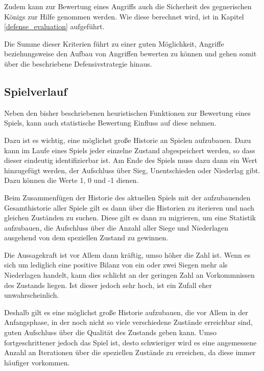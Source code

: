 
Zudem kann zur Bewertung eines Angriffs auch die Sicherheit des gegnerischen Königs zur Hilfe genommen werden. Wie diese berechnet wird, ist in Kapitel \ref{defense_evaluation} aufgeführt.

Die Summe dieser Kriterien führt zu einer guten Möglichkeit, Angriffe beziehungsweise den Aufbau von Angriffen bewerten zu können und gehen somit über die beschriebene Defensivstrategie hinaus.


\subsection{Spielverlauf}\label{history_evaluation}

Neben den bisher beschriebenen heuristischen Funktionen zur Bewertung eines Spiels, kann auch statistische Bewertung Einfluss auf diese nehmen.

Dazu ist es wichtig, eine möglichst große Historie an Spielen aufzubauen. Dazu kann im Laufe eines Spiels jeder einzelne Zustand abgespeichert werden, so dass dieser eindeutig identifizierbar ist. Am Ende des Spiels muss dazu dann ein Wert hinzugefügt werden, der Aufschluss über Sieg, Unentschieden oder Niederlag gibt. Dazu können die Werte 1, 0 und -1 dienen.

Beim Zusammenfügen der Historie des aktuellen Spiels mit der aufzubauenden Gesamthistorie aller Spiele gilt es dann über die Historien zu iterieren und nach gleichen Zuständen zu suchen. Diese gilt es dann zu migrieren, um eine Statistik aufzubauen, die Aufschluss über die Anzahl aller Siege und Niederlagen ausgehend von dem speziellen Zustand zu gewinnen.

Die Aussagekraft ist vor Allem dann kräftig, umso höher die Zahl ist. Wenn es sich um lediglich eine positive Bilanz von ein oder zwei Siegen mehr als Niederlagen handelt, kann dies schlicht an der geringen Zahl an Vorkommnissen des Zustands liegen. Ist dieser jedoch sehr hoch, ist ein Zufall eher unwahrscheinlich.

Deshalb gilt es eine möglichst große Historie aufzubauen, die vor Allem in der Anfangsphase, in der noch nicht so viele verschiedene Zustände erreichbar sind, guten Aufschluss über die Qualität des Zustands geben kann. Umso fortgeschrittener jedoch das Spiel ist, desto schwieriger wird es eine angemessene Anzahl an Iterationen über die speziellen Zustände zu erreichen, da diese immer häufiger vorkommen.

